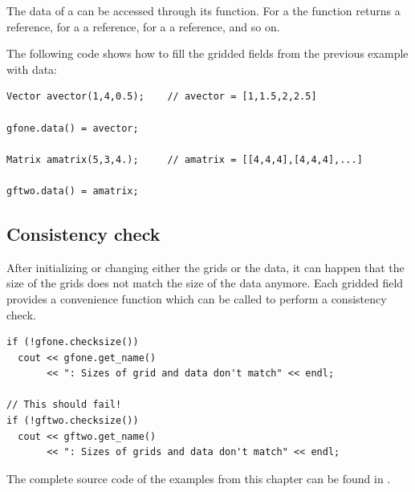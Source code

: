 The data of a  can be accessed through its  function.
For a  the  function returns a  reference, for a  a  reference, for a  a  reference, and so on.

The following code shows how to fill the gridded fields from the previous example with data:

\begin{verbatim}
Vector avector(1,4,0.5);    // avector = [1,1.5,2,2.5]

gfone.data() = avector;

Matrix amatrix(5,3,4.);     // amatrix = [[4,4,4],[4,4,4],...]

gftwo.data() = amatrix;
\end{verbatim}

\subsection{Consistency check}
\label{sec:griddedfields:consistency}

After initializing or changing either the grids or the data, it can happen
that the size of the grids does not match the size of the data anymore. Each
gridded field provides a convenience function which can be called to perform a
consistency check.

\begin{verbatim}
if (!gfone.checksize())
  cout << gfone.get_name()
       << ": Sizes of grid and data don't match" << endl;

// This should fail!
if (!gftwo.checksize())
  cout << gftwo.get_name()
       << ": Sizes of grids and data don't match" << endl;
\end{verbatim}

The complete source code of the examples from this chapter can be found in
.


